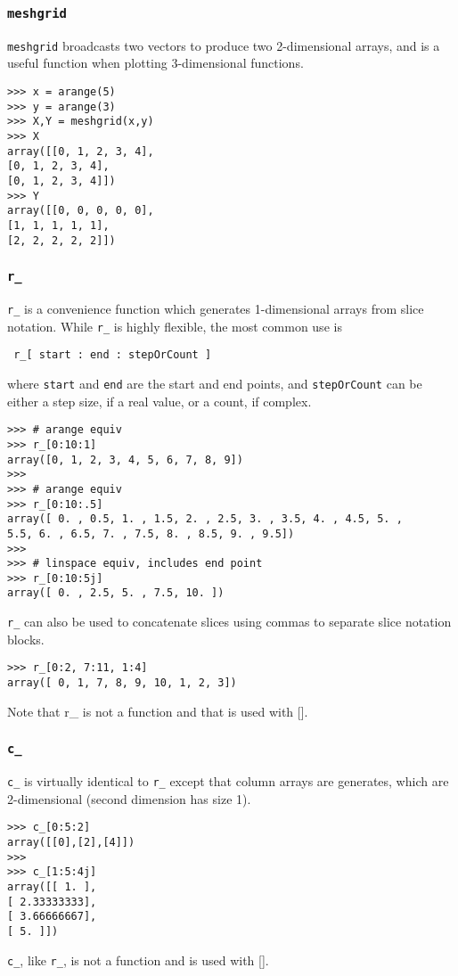 \documentclass[KSmain.tex]{subfiles}
\begin{document}
\subsubsection{\texttt{meshgrid}}
\texttt{meshgrid} broadcasts two vectors to produce two 2-dimensional arrays, and is a useful function when plotting
3-dimensional functions.
\begin{framed}
\begin{verbatim}
>>> x = arange(5)
>>> y = arange(3)
>>> X,Y = meshgrid(x,y)
>>> X
array([[0, 1, 2, 3, 4],
[0, 1, 2, 3, 4],
[0, 1, 2, 3, 4]])
>>> Y
array([[0, 0, 0, 0, 0],
[1, 1, 1, 1, 1],
[2, 2, 2, 2, 2]])
\end{verbatim}
\end{framed}
\newpage
\subsubsection{\texttt{r\_}}
\texttt{r\_} is a convenience function which generates 1-dimensional arrays from slice notation. While \texttt{r\_} is highly
flexible, the most common use is 
\begin{verbatim} r_[ start : end : stepOrCount ] 
\end{verbatim}
where \texttt{start} and \texttt{end} are the start and end
points, and \texttt{stepOrCount} can be either a step size, if a real value, or a count, if complex.
\begin{framed}
\begin{verbatim}
>>> # arange equiv
>>> r_[0:10:1] 
array([0, 1, 2, 3, 4, 5, 6, 7, 8, 9])
>>>
>>> # arange equiv
>>> r_[0:10:.5] 
array([ 0. , 0.5, 1. , 1.5, 2. , 2.5, 3. , 3.5, 4. , 4.5, 5. ,
5.5, 6. , 6.5, 7. , 7.5, 8. , 8.5, 9. , 9.5])
>>>
>>> # linspace equiv, includes end point
>>> r_[0:10:5j] 
array([ 0. , 2.5, 5. , 7.5, 10. ])
\end{verbatim}
\end{framed}
\noindent \texttt{r\_} can also be used to concatenate slices using commas to separate slice notation blocks.
\begin{framed}
\begin{verbatim}
>>> r_[0:2, 7:11, 1:4]
array([ 0, 1, 7, 8, 9, 10, 1, 2, 3])
\end{verbatim}
\end{framed}
Note that r\_ is not a function and that is used with [].
\subsubsection{\texttt{c\_}}
\texttt{c\_} is virtually identical to \texttt{r\_} except that column arrays are generates, which are 2-dimensional (second
dimension has size 1).
\begin{framed}
\begin{verbatim}
>>> c_[0:5:2]
array([[0],[2],[4]])
>>>
>>> c_[1:5:4j]
array([[ 1. ],
[ 2.33333333],
[ 3.66666667],
[ 5. ]])
\end{verbatim}
\end{framed}
\texttt{c\_}, like \texttt{r\_}, is not a function and is used with [].
\end{document}
